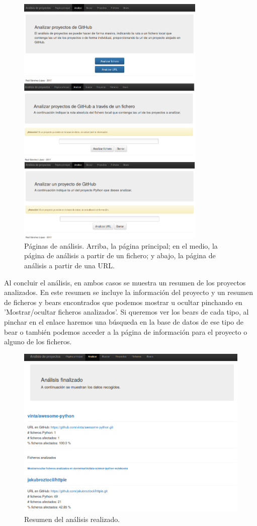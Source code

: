 \documentclass[a4paper, 12pt]{book}
\begin{document}
\begin{figure}[H]
  \centering
  \includegraphics[width=9cm, keepaspectratio]{img/webAnalisis}
  \caption{Páginas de análisis. Arriba, la página principal; en el medio, la página de análisis a partir de un fichero; y abajo, la página de análisis a partir de una URL.}
  \label{fig:webAnalisis}
\end{figure}

Al concluir el análisis, en ambos casos se muestra un resumen de los proyectos analizados. En este resumen se incluye la información del proyecto y un resumen de ficheros y bears encontrados que podemos mostrar u ocultar pinchando en 'Mostrar/ocultar ficheros analizados'. Si queremos ver los bears de cada tipo, al pinchar en el enlace haremos una búsqueda en la base de datos de ese tipo de bear o también podemos acceder a la página de información para el proyecto o alguno de los ficheros.

\begin{figure}[H]
  \centering
  \includegraphics[width=12cm, keepaspectratio]{img/resumenAnalisis}
  \caption{Resumen del análisis realizado.}
  \label{fig:resumenAnalisis}
\end{figure}
\end{document}
